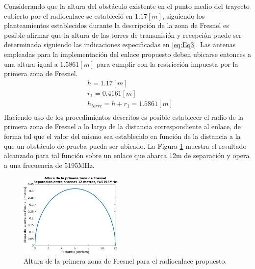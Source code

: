 \documentclass[conference]{IEEEtran}
\begin{document}
Considerando que la altura del obstáculo existente en el punto medio del trayecto cubierto por el radioenlace se estableció en $1.17[m]$, siguiendo 
los planteamientos establecidos durante la descripción de la zona de Fresnel es posible afirmar que la altura de las torres de transmisión y recepción 
puede ser determinada siguiendo las indicaciones especificadas en \ref{eq:Eq3}. Las antenas empleadas para la implementación del enlace propuesto deben ubicarse entonces
a una altura igual a $1.5861[m]$ para cumplir con la restricción impuesta por la primera zona de Fresnel.
\begin{equation}
    \label{eq:Eq3}
    \begin{aligned}
        &h =1.17[m]\\
        &r_1 = 0.4161[m]\\
        &h_{torre} = h+r_{1}=1.5861[m]\\
    \end{aligned}
\end{equation}
Haciendo uso de los procedimientos descritos es posible establecer el radio de la primera zona de Fresnel a lo
largo de la distancia correspondiente al enlace, de forma tal que el valor del mismo sea establecido en función 
de la distancia a la que un obstáculo de prueba pueda ser ubicado. La Figura \ref{fig:Altura_Fresnel} muestra el resultado alcanzado para 
tal función sobre un enlace que abarca 12m de separación y opera a una frecuencia de 5195MHz.
\begin{figure}
    \centering
          \includegraphics[width=0.45\textwidth]{Altura_Fresnel.png}
        \caption{Altura de la primera zona de Fresnel para el radioenlace propuesto.
        }
        \label{fig:Altura_Fresnel}
\end{figure}
\end{document}
